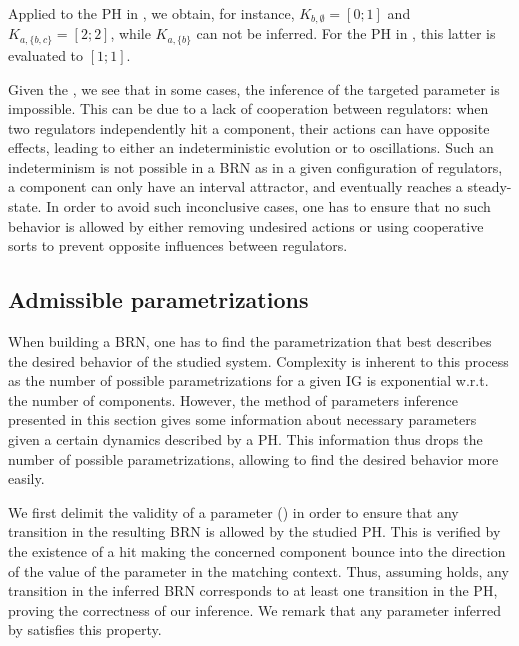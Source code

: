 \begin{example*}
Applied to the PH in , we obtain, for instance, 
$K_{b,\emptyset} = [0 ; 1]$ and
$K_{a,\{b,c\}} = [2 ; 2]$,
while $K_{a,\{b\}}$ can not be inferred.
For the PH in , this latter is evaluated to $[1;1]$.
\end{example*}

Given the , we see that in some cases, the inference of the targeted parameter is impossible.
This can be due to a lack of cooperation between regulators: when two regulators independently hit a component, their actions can have opposite effects, leading to either an indeterministic evolution or to oscillations.
Such an indeterminism is not possible in a BRN as in a given configuration of regulators, a component can only have an interval attractor, and eventually reaches a steady-state.
In order to avoid such inconclusive cases, one has to ensure that no such behavior is allowed by
either removing undesired actions or using cooperative sorts to prevent opposite influences between
regulators.

\subsection{Admissible parametrizations}\label{ssec:admissible-K}

When building a BRN, one has to find the parametrization that best describes the desired behavior of the studied system.
Complexity is inherent to this process as the number of possible parametrizations for a given IG is exponential w.r.t. the number of components.
However, the method of parameters inference presented in this section gives some information about necessary parameters given a certain dynamics described by a PH.
This information thus drops the number of possible parametrizations, allowing to find the desired behavior more easily.

We first delimit the validity of a parameter () in order to ensure that any
transition in the resulting BRN is allowed by the studied PH.
This is verified by the existence of a hit making the concerned component bounce into the direction
of the value of the parameter in the matching context.
Thus, assuming  holds, any transition in the inferred BRN corresponds to at least
one transition in the PH, proving the correctness of our inference.
We remark that any parameter inferred by  satisfies this property.

